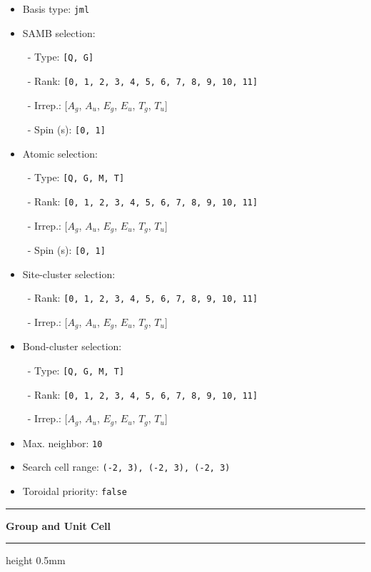 \documentclass[fleqn,10pt,landscape]{jsarticle}
\begin{document}
\begin{itemize}
\item Basis type: \texttt{jml}

\item SAMB selection:

\, - Type: \texttt{[Q, G]}

\, - Rank: \texttt{[0, 1, 2, 3, 4, 5, 6, 7, 8, 9, 10, 11]}

\, - Irrep.: [$A_{g}$, $A_{u}$, $E_{g}$, $E_{u}$, $T_{g}$, $T_{u}$]

\, - Spin (s): \texttt{[0, 1]}

\item Atomic selection:

\, - Type: \texttt{[Q, G, M, T]}

\, - Rank: \texttt{[0, 1, 2, 3, 4, 5, 6, 7, 8, 9, 10, 11]}

\, - Irrep.: [$A_{g}$, $A_{u}$, $E_{g}$, $E_{u}$, $T_{g}$, $T_{u}$]

\, - Spin (s): \texttt{[0, 1]}

\item Site-cluster selection:

\, - Rank: \texttt{[0, 1, 2, 3, 4, 5, 6, 7, 8, 9, 10, 11]}

\, - Irrep.: [$A_{g}$, $A_{u}$, $E_{g}$, $E_{u}$, $T_{g}$, $T_{u}$]

\item Bond-cluster selection:

\, - Type: \texttt{[Q, G, M, T]}

\, - Rank: \texttt{[0, 1, 2, 3, 4, 5, 6, 7, 8, 9, 10, 11]}

\, - Irrep.: [$A_{g}$, $A_{u}$, $E_{g}$, $E_{u}$, $T_{g}$, $T_{u}$]

\item Max. neighbor: \texttt{10}

\item Search cell range: \texttt{(-2, 3), (-2, 3), (-2, 3)}

\item Toroidal priority: \texttt{false}

\end{itemize}
\vspace{5mm}
\noindent \rule[0.5mm]{5mm}{0.5mm}\hspace{3mm}\textbf{Group and Unit Cell}\hspace{3mm}\leaders\hrule height 0.5mm\hfill\kern0pt
\vspace{3mm}
\end{document}

